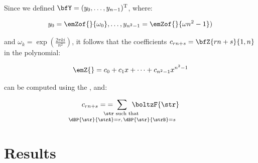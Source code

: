 \documentclass{beamer}
\begin{document}
\begin{frame}
  Since we defined $\bfY =
  (y_0,\dots,y_{n-1})^{\text T}$, where:

  \begin{align*}
  y_0=\emZof{}{\omega_0},\dots,y_{n^2-1}=\emZof{}{\omega{n^2-1}})
  \end{align*}

  and $\omega_k = \exp(\frac{2\pi ki}{n^2})$, it follows that the coefficients
  $c_{rn+s}=\bfZ{rn+s}{1,n}$ in the polynomial:

  \begin{align*}
  \emZ{} = c_0 + c_1 x + \dots + c_{n^2-1} x^{n^2-1}
  \end{align*}

   can be computed using the \fft, and:

  \begin{align*}
    c_{rn+s}=\;=\;
    \sum_{\mathclap{\substack{
    \str \text{ such that } \rule[-.5ex]{0pt}{0pt} \\
    \dBP{\str}{\strA} = r,\,\dBP{\str}{\strB} = s}}}\enspace
    \boltzF{\str}
  \end{align*}
\end{frame}

\section{Results}
\end{document}
